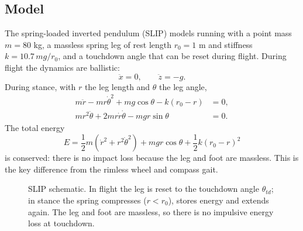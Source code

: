 \documentclass[11pt]{article}
\begin{document}
\subsection{Model}

The spring-loaded inverted pendulum (SLIP) models running with a point mass
$m=80$ kg, a massless spring leg of rest length $r_0=1$ m and stiffness
$k=10.7\,m g/r_0$, and a touchdown angle that can be reset during flight.
During flight the dynamics are ballistic:
\begin{equation}
\ddot x=0,\qquad
\ddot z=-g .
\end{equation}
During stance, with $r$ the leg length and $\theta$ the leg angle,
\begin{align}
m\ddot r-mr\dot\theta^2+mg\cos\theta-k(r_0-r)&=0,\\
mr^2\ddot\theta+2mr\dot r\dot\theta-mgr\sin\theta&=0 .
\end{align}
The total energy
\begin{equation}
E=\frac12m\left(\dot r^2+r^2\dot\theta^2\right)
+mgr\cos\theta+\frac12k(r_0-r)^2
\end{equation}
is conserved: there is no impact loss because the leg and foot are massless.
This is the key difference from the rimless wheel and compass gait.

\begin{figure}[htbp]
\centering
{}
\caption{SLIP schematic.  In flight the leg is reset to the touchdown angle
$\theta_{td}$; in stance the spring compresses ($r<r_0$), stores energy and
extends again.  The leg and foot are massless, so there is no impulsive
energy loss at touchdown.}
\label{fig:slip}
\end{figure}
\end{document}
